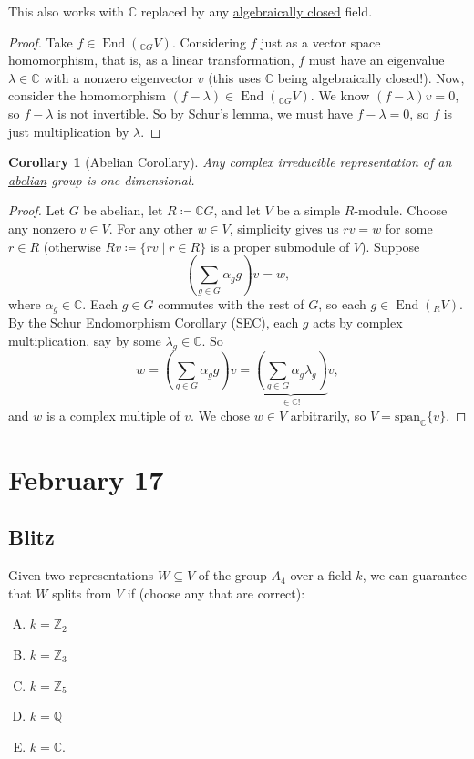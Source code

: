 \documentclass[12pt]{article}
\newcommand{\z}{\mathbb{Z}}
\newcommand{\q}{\mathbb{Q}}
\newcommand{\cx}{\mathbb{C}}
\newtheorem{corollary}[theorem]{Corollary}
\theoremstyle{definition}
\DeclareMathOperator\End{End}
\begin{document}
This also works with $\cx$ replaced by any \underline{algebraically closed} field.
\begin{proof}
    Take $f\in\End(_{\cx G}V)$. Considering $f$ just as a vector space homomorphism, that is, as a linear transformation, $f$ must have an eigenvalue $\lambda \in \cx$ with a nonzero eigenvector $v$ (this uses $\cx$ being algebraically closed!). Now, consider the homomorphism $(f-\lambda)\in\End(_{\cx G}V)$. We know $(f-\lambda)v=0$, so $f-\lambda$ is not invertible. So by Schur's lemma, we must have $f-\lambda=0$, so $f$ is just multiplication by $\lambda$.
\end{proof}
\begin{corollary}[Abelian Corollary]
    Any complex irreducible representation of an \underline{abelian} group is one-dimensional.
\end{corollary}
\begin{proof}
    Let $G$ be abelian, let $R\coloneqq \cx G$, and let $V$ be a simple $R$-module. Choose any nonzero $v\in V$. For any other $w\in V$, simplicity gives us $rv=w$ for some $r\in R$ (otherwise $Rv\coloneqq \{rv\mid r\in R\}$ is a proper submodule of $V$). Suppose 
    \begin{equation}
        \left(\sum\limits_{g\in G}\alpha_gg\right)v=w,
    \end{equation}
    where $\alpha_g\in\cx$. Each $g\in G$ commutes with the rest of $G$, so each $g\in\End(_RV)$. By the Schur Endomorphism Corollary (SEC), each $g$ acts by complex multiplication, say by some $\lambda_g\in\cx$. So 
    \begin{equation}
        w=\left(\sum\limits_{g\in G}\alpha_gg\right)v=\underbrace{\left(\sum\limits_{g\in G}\alpha_g\lambda_g\right)}_{\in\cx!}v,
    \end{equation}
    and $w$ is a complex multiple of $v$. We chose $w\in V$ arbitrarily, so $V=\mathrm{span}_{\cx}\{v\}$.
\end{proof}
\section{February 17}
\subsection{Blitz}
Given two representations $W\subseteq V$ of the group $A_4$ over a field $k$, we can guarantee that $W$ splits from $V$ if (choose any that are correct):
\begin{multicols}{3}
    \begin{enumerate}[A)]
        \item $k=\z_2$
        \item $k=\z_3$
        \item $k=\z_5$
        \item $k=\q$
        \item $k=\cx$.
    \end{enumerate}
\end{multicols}
\end{document}
